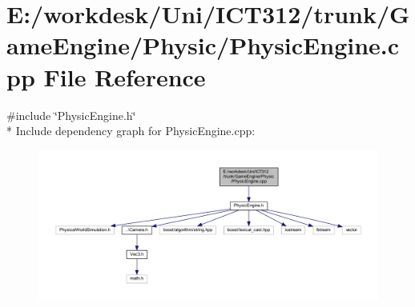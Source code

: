 \section{E\+:/workdesk/\+Uni/\+I\+C\+T312/trunk/\+Game\+Engine/\+Physic/\+Physic\+Engine.cpp File Reference}
\label{_physic_engine_8cpp}
{\ttfamily \#include \char`\"{}Physic\+Engine.\+h\char`\"{}}\\*
Include dependency graph for Physic\+Engine.\+cpp\+:\nopagebreak
\begin{figure}[H]
\begin{center}
\leavevmode
\includegraphics[width=350pt]{d5/de7/_physic_engine_8cpp__incl}
\end{center}
\end{figure}
